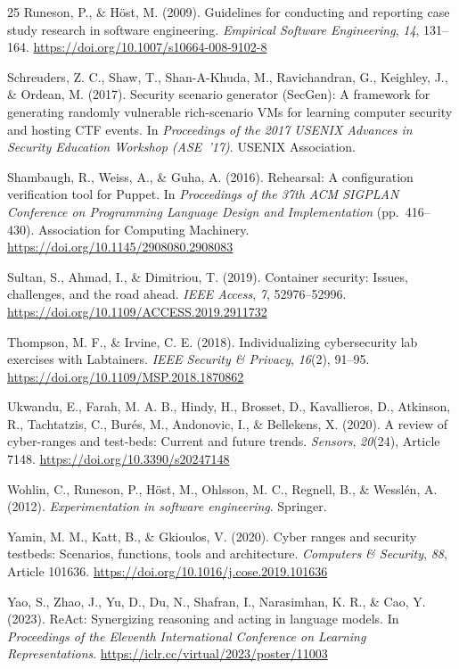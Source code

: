 \documentclass[3p,twocolumn,authoryear]{elsarticle}
\begin{document}
\begin{thebibliography}{25}
Runeson, P., \& H\"ost, M. (2009). Guidelines for conducting and
reporting case study research in software engineering.
\textit{Empirical Software Engineering}, \textit{14}, 131--164.
\url{https://doi.org/10.1007/s10664-008-9102-8}

Schreuders, Z. C., Shaw, T., Shan-A-Khuda, M., Ravichandran, G.,
Keighley, J., \& Ordean, M. (2017). Security scenario generator
(SecGen): A framework for generating randomly vulnerable rich-scenario
VMs for learning computer security and hosting CTF events. In
\textit{Proceedings of the 2017 USENIX Advances in Security Education
Workshop (ASE~'17)}. USENIX Association.

Shambaugh, R., Weiss, A., \& Guha, A. (2016). Rehearsal: A configuration
verification tool for Puppet. In \textit{Proceedings of the 37th ACM
SIGPLAN Conference on Programming Language Design and Implementation}
(pp.~416--430). Association for Computing Machinery.
\url{https://doi.org/10.1145/2908080.2908083}

Sultan, S., Ahmad, I., \& Dimitriou, T. (2019). Container security:
Issues, challenges, and the road ahead. \textit{IEEE Access},
\textit{7}, 52976--52996. \url{https://doi.org/10.1109/ACCESS.2019.2911732}

Thompson, M. F., \& Irvine, C. E. (2018). Individualizing cybersecurity
lab exercises with Labtainers. \textit{IEEE Security \& Privacy},
\textit{16}(2), 91--95. \url{https://doi.org/10.1109/MSP.2018.1870862}

Ukwandu, E., Farah, M. A. B., Hindy, H., Brosset, D., Kavallieros, D.,
Atkinson, R., Tachtatzis, C., Bur\'es, M., Andonovic, I., \& Bellekens,
X. (2020). A review of cyber-ranges and test-beds: Current and future
trends. \textit{Sensors}, \textit{20}(24), Article 7148.
\url{https://doi.org/10.3390/s20247148}

Wohlin, C., Runeson, P., H\"ost, M., Ohlsson, M. C., Regnell, B., \&
Wessl\'en, A. (2012). \textit{Experimentation in software engineering}.
Springer.

Yamin, M. M., Katt, B., \& Gkioulos, V. (2020). Cyber ranges and
security testbeds: Scenarios, functions, tools and architecture.
\textit{Computers \& Security}, \textit{88}, Article 101636.
\url{https://doi.org/10.1016/j.cose.2019.101636}

Yao, S., Zhao, J., Yu, D., Du, N., Shafran, I., Narasimhan, K. R., \&
Cao, Y. (2023). ReAct: Synergizing reasoning and acting in language
models. In \textit{Proceedings of the Eleventh International
Conference on Learning Representations}.
\url{https://iclr.cc/virtual/2023/poster/11003}

\end{thebibliography}
\end{document}
